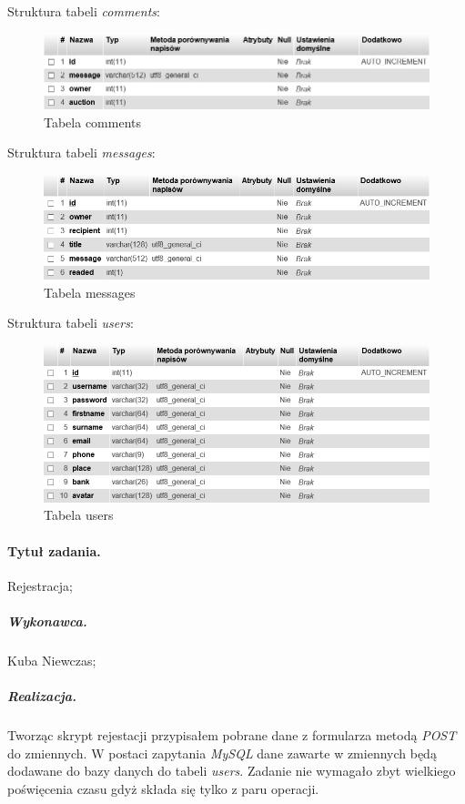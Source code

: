 \documentclass[a4paper]{article}
\begin{document}
	Struktura tabeli \emph{comments}:
	
	\begin{figure}[h]
		\centering
		\includegraphics[width=12cm]{images/comments.jpg}
		\caption{Tabela comments}
	\end{figure}
	
	Struktura tabeli \emph{messages}:
	
	\begin{figure}[h]
		\centering
		\includegraphics[width=12cm]{images/messages.jpg}
		\caption{Tabela messages}
	\end{figure}
	
	Struktura tabeli \emph{users}:
	
	\begin{figure}[h]
		\centering
		\includegraphics[width=12cm]{images/users.jpg}
		\caption{Tabela users}
	\end{figure}
	
	\paragraph{Tytuł zadania.} Rejestracja;
	\subparagraph{Wykonawca.} Kuba Niewczas;
	\subparagraph{Realizacja.} Tworząc skrypt rejestacji przypisałem pobrane dane z formularza metodą \emph{POST} do zmiennych. W postaci zapytania \emph{MySQL} dane zawarte w zmiennych będą dodawane do bazy danych do tabeli \emph{users}. Zadanie nie wymagało zbyt wielkiego poświęcenia czasu gdyż składa się tylko z paru operacji.
	
\end{document}
